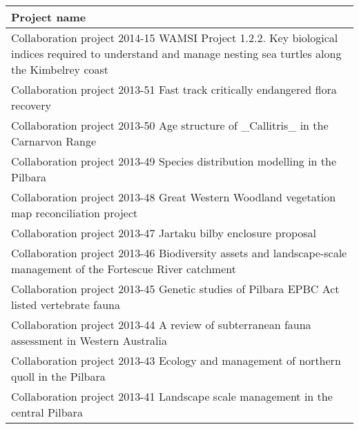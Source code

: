\documentclass[version=last, paper=a4, DIV=18, usenames, dvipsnames]{scrartcl}
\begin{document}
\begin{longtabu} to \linewidth { | X |}
\hline
{}
Project name\\
\hline
\endhead

  Collaboration project 2014-15 WAMSI Project 1.2.2. Key biological indices required to understand and manage nesting sea turtles along the Kimbelrey coast \newline  \\ \hline

  Collaboration project 2013-51 Fast track critically endangered flora recovery \newline  \\ \hline

  Collaboration project 2013-50 Age structure of \_Callitris\_ in the Carnarvon Range \newline  \\ \hline

  Collaboration project 2013-49 Species distribution modelling in the Pilbara \newline  \\ \hline

  Collaboration project 2013-48 Great Western Woodland vegetation map reconciliation project \newline  \\ \hline

  Collaboration project 2013-47 Jartaku bilby enclosure proposal \newline  \\ \hline

  Collaboration project 2013-46 Biodiversity assets and landscape-scale management of the Fortescue River catchment \newline  \\ \hline

  Collaboration project 2013-45 Genetic studies of Pilbara EPBC Act listed vertebrate fauna \newline  \\ \hline

  Collaboration project 2013-44 A review of subterranean fauna assessment in Western Australia \newline  \\ \hline

  Collaboration project 2013-43 Ecology and management of northern quoll in the Pilbara \newline  \\ \hline

  Collaboration project 2013-41 Landscape scale management in the central Pilbara \newline  \\ \hline


\end{longtabu}
\end{document}
